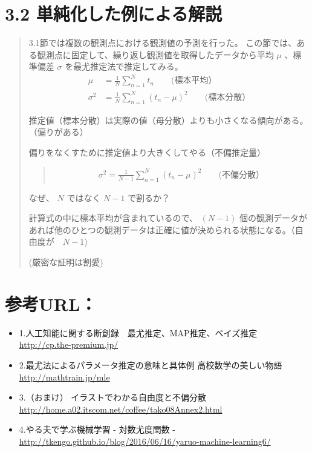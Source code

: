 \documentclass[letterpaper,10pt,dvipdfmx]{sphinxmanual}
\begin{document}
\section{3.2 単純化した例による解説}
\label{Chapter_3_MLE:id9}\begin{quote}

3.1節では複数の観測点における観測値の予測を行った。
この節では、ある観測点に固定して、繰り返し観測値を取得したデータから平均 \(\mu\) 、標準偏差 \(\sigma\) を最尤推定法で推定してみる。
\begin{equation*}
\begin{split}\mu &= \frac{1}{N} \sum_{n=1}^{N} t_n   \qquad (標本平均） \\
\sigma^2 &= \frac{1}{N} \sum_{n=1}^{N} ( t_n - \mu)^2　　\qquad (標本分散）\end{split}
\end{equation*}
\noindent{}

推定値（標本分散）は実際の値（母分散）よりも小さくなる傾向がある。（偏りがある）

偏りをなくすために推定値より大きくしてやる（不偏推定量）
\begin{quote}
\begin{equation*}
\begin{split}\sigma^2 = \frac{1}{N-1} \sum_{n=1}^{N} ( t_n - \mu)^2　　\qquad (不偏分散）\end{split}
\end{equation*}\end{quote}

なぜ、 \(N\) ではなく \(N-1\) で割るか？

計算式の中に標本平均が含まれているので、 \((N-1)\) 個の観測データがあれば他のひとつの観測データは正確に値が決められる状態になる。（自由度が　\(N-1\))

(厳密な証明は割愛)
\end{quote}


\section{参考URL：}
\label{Chapter_3_MLE:url}\begin{itemize}
\item {} 
1.人工知能に関する断創録　最尤推定、MAP推定、ベイズ推定 \url{http://cp.the-premium.jp/}

\item {} 
2.最尤法によるパラメータ推定の意味と具体例 \textbar{} 高校数学の美しい物語 \url{http://mathtrain.jp/mle}

\item {} 
3.（おまけ） イラストでわかる自由度と不偏分散 \url{http://home.a02.itscom.net/coffee/tako08Annex2.html}

\item {} 
4.やる夫で学ぶ機械学習 - 対数尤度関数 - \url{http://tkengo.github.io/blog/2016/06/16/yaruo-machine-learning6/}

\end{itemize}
\end{document}
